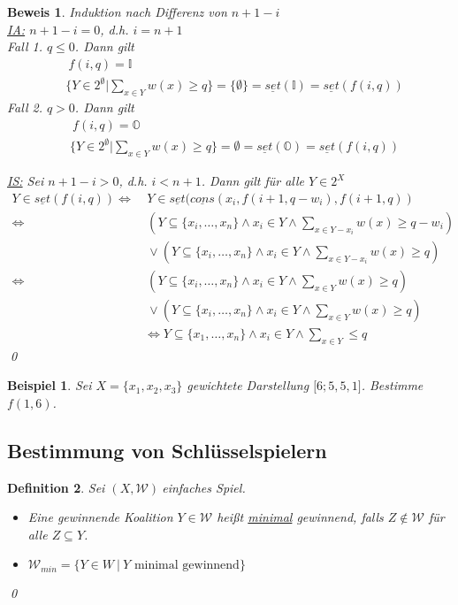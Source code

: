 \documentclass[ngerman]{scrartcl}
\theoremstyle{custom}
\newtheorem{mdef}{Definition} \numberwithin{mdef}{subsection}
\newtheorem{mex}[mdef]{Beispiel}
\newtheorem*{bw}{Beweis}
\newcommand{\0}{\mathbf{0}}
\newcommand{\1}{\mathbf{L}}
\newcommand{\set}{\underline{set}}
\newcommand{\cons}{\underline{cons}}
\newcommand{\sg}{$(X,\mathcal{W})~$}
\begin{document}
\begin{bw}
Induktion nach Differenz von $n+1-i$\\
\underline{IA:} $n+1-i = 0$, d.h. $i = n+1$\\
Fall 1. $q \leq 0$. Dann gilt 
\begin{align*}
&~f(i,q) = \mathds{I}\\
&\biggr \{Y \in 2^{\emptyset} \biggr \vert \sum_{x \in Y} w(x) \geq q
\biggr \} = \{\emptyset\} = \set(\mathds{I}) = \set(f(i,q))
\end{align*}
Fall 2. $q > 0$. Dann gilt
\begin{align*}
&~f(i,q) = \mathds{O}\\
&\biggr \{Y \in 2^{\emptyset} \biggr \vert \sum_{x \in Y} w(x) \geq q
\biggr \} = \emptyset = \set(\mathds{O}) = \set(f(i,q))
\end{align*}

\underline{IS:} Sei $n+1-i>0$, d.h. $i < n+1$. Dann gilt f\"ur alle $Y
\in 2^X$
\begin{align*}
  Y \in \set(f(i,q)) \Leftrightarrow &~ Y \in
  \set(\cons(x_i,f(i+1,q-w_i),
  f(i+1, q))\\
  \Leftrightarrow &~ (Y \subseteq \{x_i, \dots, x_n\} \wedge x_i \in Y
  \wedge \sum_{x \in Y-x_i} w(x) \geq q - w_i) \\ &~\vee (Y \subseteq
  \{x_i, \dots, x_n\} \wedge x_i \in Y
  \wedge \sum_{x \in Y-x_i} w(x) \geq q)\\
  \Leftrightarrow &~ (Y \subseteq \{x_i, \dots, x_n\} \wedge x_i \in Y
  \wedge \sum_{x \in Y} w(x) \geq q)\\
  & ~\vee (Y \subseteq \{x_i, \dots, x_n\} \wedge x_i \in Y \wedge
  \sum_{x \in Y} w(x) \geq q)\\
  & \Leftrightarrow Y \subseteq \{x_1, \dots, x_n\} \wedge x_i \in Y
  \wedge \sum_{x \in Y} \leq q
\end{align*}
\qed
\end{bw}

\begin{mex}
Sei $X = \{x_1,x_2,x_3\}$ gewichtete Darstellung $\lbrack 6;
5,5,1\rbrack$. Bestimme $f(1,6)$.
\end{mex}

\subsection{Bestimmung von Schl\"usselspielern}
\begin{mdef}
Sei \sg einfaches Spiel.
\begin{itemize}
\item[(1)] Eine gewinnende Koalition $Y \in \mathcal{W}$ hei\ss t
  \underline{minimal} gewinnend, falls $Z \not \in \mathcal{W}$ f\"ur
  alle $Z \subseteq Y$.
\item[(2)] $\mathcal{W}_{min} = \{ Y \in W ~\vert~ Y \text{ minimal
    gewinnend} \}$
\end{itemize}
\qed
\end{mdef}
\end{document}
